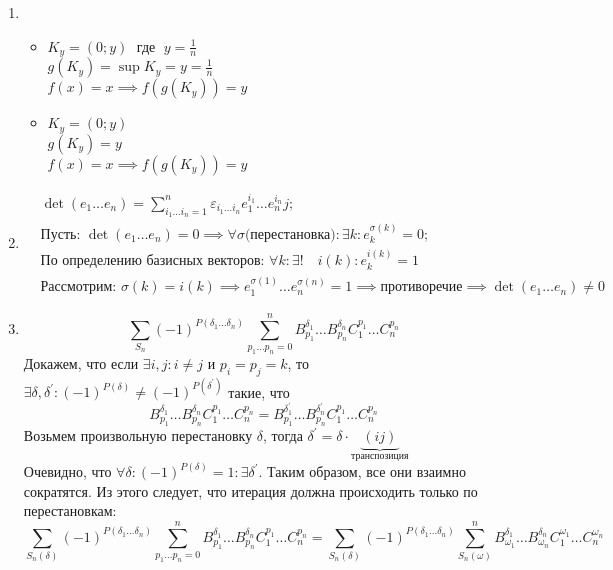 \documentclass{article}
\begin{document}
\begin{enumerate}
\begin{itemize}
        \end{itemize}
    \item 
    \begin{itemize}
        \item $K_y = (0; y) \;$ где $\; y = \frac{1}{n}$ \\
         $g(K_y) = \sup K_y = y = \frac{1}{n}$ \\
         $f(x) = x \implies f(g(K_y)) = y$ \\
         \item
         $K_y = (0; y)$ \\
         $g(K_y) = y$ \\
         $f(x) = x \implies f(g(K_y)) = y$

    \end{itemize}
    \item  
    \begin{align*}
        &\det (e_1 \dots e_n) = \sum\limits_{i_1\dots i_n = 1}^{n}{\varepsilon_{i_1 \dots i_n} e_{1}^{i_1} \dots e_{n}^{i_n}}j; \\
        &\text{Пусть: } \det (e_1 \dots e_n) = 0 \implies \forall \sigma \text{(перестановка)}: \exists k: e_{k}^{\sigma(k)} = 0; \\
        &\text {По определению базисных векторов: } \forall k: \exists ! \quad i(k) : e_{k}^{i(k)} = 1 \\
        & \text{Рассмотрим: } \sigma(k) = i(k) \implies e_{1}^{\sigma(1)}  \dots  e_{n}^{\sigma(n)} = 1 \implies \text{противоречие} \implies \det (e_1 \dots e_n) \neq 0
    \end{align*}
    \item  
        $$
            \sum\limits_{S_n}{
                (-1)^{P(\delta_1 \dots \delta_n)} 
                \sum\limits_{p_1 \dots p_n = 0}^{n}{B^{\delta_1}_{p_1} \dots B^{\delta_n}_{p_n}  C^{p_1}_{1} \dots C^{p_n}_{n}}
            }
        $$
        Докажем, что если $\exists i, j: i \neq j $ и $ p_i = p_j = k$, то \quad $\exists \delta, \delta^{\prime}: (-1)^{P(\delta)} \neq (-1)^{P(\delta^{\prime})}$ такие, что 
        $$
          B^{\delta_1}_{p_1} \dots B^{\delta_n}_{p_n}  C^{p_1}_{1} \dots C^{p_n}_{n}  = B^{\delta^{\prime}_1}_{p_1} \dots B^{\delta^{\prime}_n}_{p_n}  C^{p_1}_{1} \dots C^{p_n}_{n}
        $$
        Возьмем произвольную перестановку $\delta$, тогда $\delta^{\prime} = \delta \cdot \underbrace{(i j)}_\text{транспозиция}$ \\
        Очевидно, что  $\forall \delta: (-1)^{P(\delta)} = 1: \exists \delta^{\prime}$. Таким образом, все они взаимно сократятся.
        Из этого следует, что итерация должна происходить только по перестановкам:
        $$
        \sum\limits_{S_n(\delta)}{
                (-1)^{P(\delta_1 \dots \delta_n)} 
                \sum\limits_{p_1 \dots p_n = 0}^{n}{B^{\delta_1}_{p_1} \dots B^{\delta_n}_{p_n}  C^{p_1}_{1} \dots C^{p_n}_{n}}
            } = 
            \sum\limits_{S_n(\delta)}{
                (-1)^{P(\delta_1 \dots \delta_n)} 
                \sum\limits_{S_n(\omega)}^{n}{B^{\delta_1}_{\omega_1} \dots B^{\delta_n}_{\omega_n}  C^{\omega_1}_{1} \dots C^{\omega_n}_{n}}
            }
        $$


\end{enumerate}
\end{document}
